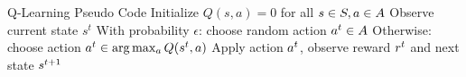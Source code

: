 \begin{frame}{Q-Learning Pseudo Code}
    \centering
        \State Initialize $Q(s, a) = 0$  for all $s \in S, a \in A$
                \State Observe current state $s^t$
                \State With probability $\epsilon$: choose random action $a^t \in A$
                \State Otherwise: choose action $a^t \in \arg\max_{a} Q(s^t, a)$
                \State Apply action $a^t$, observe reward $r^t$ and next state $s^{t+1}$
                \State {}
            \EndFor
        \EndFor
    \ealg
\end{frame}



